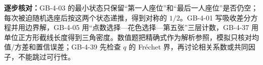 {\begin{enumerate}[leftmargin=*]
\end{enumerate}
\par\textbf{逐步核对：}GB-4-03 的最小状态只保留“第一人座位”和“最后一人座位”是否仍空；每次被迫随机选座后按这两个状态递推，得到对称的 $1/2$。GB-4-01 写吸收差分方程并用边界解，GB-4-05 用“点数选择—花色选择—第五张”三层计数，GB-4-37 用单位正方形截线长度得到三角密度。数值题把精确式作为解析参照，模拟只核对均值/方差和置信误差；GB-4-39 先检查 $q$ 的 Fr\'echet 界，再讨论相关系数或共同因子，不能跳过可行性。}

